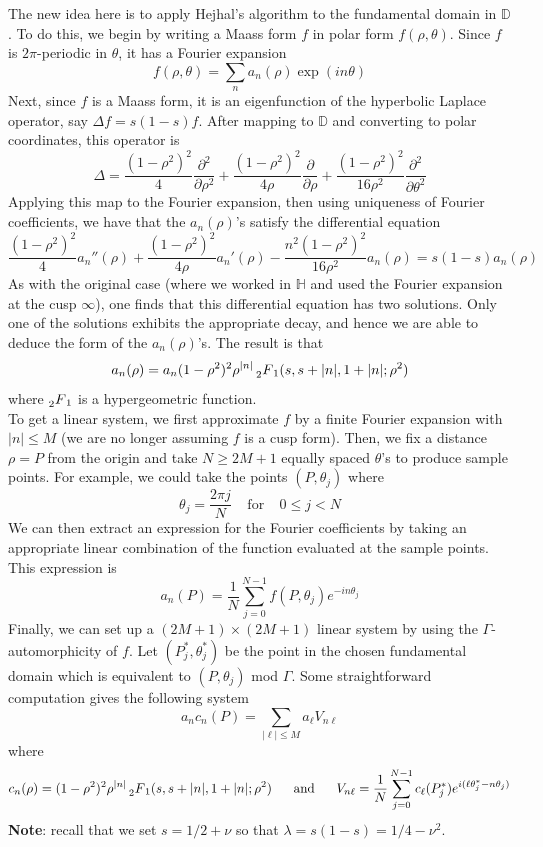 \documentclass[]{article}
\begin{document}
The new idea here is to apply Hejhal's algorithm to the fundamental domain in $\mathbb{D}$.
To do this, we begin by writing a Maass form $f$ in polar form $f(\rho, \theta)$.
Since $f$ is $2\pi$-periodic in $\theta$, it has a Fourier expansion
$$
f(\rho, \theta) = \sum_n a_n(\rho)\exp(in\theta)
$$
Next, since $f$ is a Maass form, it is an eigenfunction of the hyperbolic Laplace operator, say $\Delta f = s(1-s)f$.
After mapping to $\mathbb{D}$ and converting to polar coordinates, this operator is
$$
\Delta = \frac{(1 - \rho^2)^2}{4}\frac{\partial^2}{\partial\rho^2} +
\frac{(1 - \rho^2)^2}{4\rho}\frac{\partial}{\partial\rho} +
\frac{(1 - \rho^2)^2}{16\rho^2}\frac{\partial^2}{\partial\theta^2}
$$
Applying this map to the Fourier expansion, then using uniqueness of Fourier coefficients, we have that the $a_n(\rho)$'s satisfy the differential equation
$$
\frac{(1-\rho^2)^2}{4}a_n''(\rho) + \frac{(1-\rho^2)^2}{4\rho}a_n'(\rho) - \frac{n^2(1-\rho^2)^2}{16\rho^2}a_n(\rho) = s(1-s)a_n(\rho)
$$
As with the original case (where we worked in $\mathbb{H}$ and used the Fourier expansion at the cusp $\infty$), one finds that this differential equation has two solutions.
Only one of the solutions exhibits the appropriate decay, and hence we are able to deduce the form of the $a_n(\rho)$'s.
The result is that
$$
a_n(\rho) = a_n(1 - \rho^2)^2\rho^{|n|} \prescript{}{2}{F}_1(s, s+|n|, 1+|n|; \rho^2)
$$
where $\prescript{}{2}{F}_1$ is a hypergeometric function.
\\

To get a linear system, we first approximate $f$ by a finite Fourier expansion with $|n| \leq M$ (we are no longer assuming $f$ is a cusp form).
Then, we fix a distance $\rho = P$ from the origin and take $N \geq 2M+1$ equally spaced $\theta$'s to produce sample points.
For example, we could take the points $(P, \theta_j)$ where
$$
\theta_j = \frac{2\pi j}{N} ~~~~~\text{for}~~~~~0 \leq j < N
$$
We can then extract an expression for the Fourier coefficients by taking an appropriate linear combination of the function evaluated at the sample points.
This expression is
$$
a_n(P) = \frac{1}{N}\sum_{j=0}^{N-1}f(P, \theta_j)e^{-in\theta_j}
$$
Finally, we can set up a $(2M+1)\times (2M+1)$ linear system by using the $\Gamma$-automorphicity of $f$.
Let $(P_j^*, \theta_j^*)$ be the point in the chosen fundamental domain which is equivalent to $(P, \theta_j)$ mod $\Gamma$.
Some straightforward computation gives the following system
\begin{equation}\label{linSys}
	a_nc_n(P) = \sum_{|\ell| \leq M} a_\ell V_{n\ell}
\end{equation}
where
$$
c_n(\rho) = (1-\rho^2)^2\rho^{|n|} \prescript{}{2}{F}_1(s, s+|n|, 1+|n|; \rho^2)
~~~~~\text{and}~~~~~
V_{n\ell} = \frac{1}{N}\sum_{j=0}^{N-1}c_\ell(P_j^*)e^{i(\ell\theta_j^* - n\theta_j)}
$$
\textbf{Note}: recall that we set $s = 1/2 + \nu$ so that $\lambda = s(1-s) = 1/4 - \nu^2$.
\end{document}

